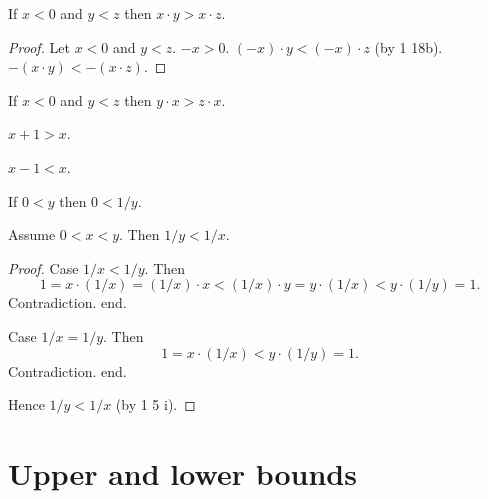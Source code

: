 \documentclass{article}
\begin{document}
\begin{forthel}
\begin{proposition}[1 18 c] If $x < 0$ and $y < z$ then 
$x \cdot y > x \cdot z$.\end{proposition}
\begin{proof} Let $x < 0$ and $y < z$.
$-x > 0$.
$(-x)\cdot y < (-x)\cdot z$ (by 1 18b).
$-(x\cdot y) < -(x\cdot z)$.
\end{proof}

\begin{proposition}[1 18 cc] If $x < 0$ and $y < z$ then 
$y \cdot x > z \cdot x$.\end{proposition}

\begin{proposition} $x + 1 > x$.\end{proposition}
\begin{proposition} $x - 1 < x$. \end{proposition}


\begin{proposition}[1 18 e] If $0 < y$ then $0 < 1/y$.
\end{proposition}

\begin{proposition}[1 18 ee] Assume $0 < x < y$. Then $1/y < 1/x$.
\end{proposition}
\begin{proof} 
Case $1/x < 1/y$. Then
$$1 = x \cdot (1/x) = (1/x) \cdot x < (1/x) \cdot y = 
y \cdot (1/x) < y \cdot (1/y) = 1.$$ 
Contradiction. end.

Case $1/x = 1/y$. Then
$$1 = x \cdot (1/x) < y \cdot (1/y) = 1.$$ 
Contradiction. end.

Hence $1/y < 1/x$ (by 1 5 i).
\end{proof}

\end{forthel}

\section{Upper and lower bounds}
\end{document}
